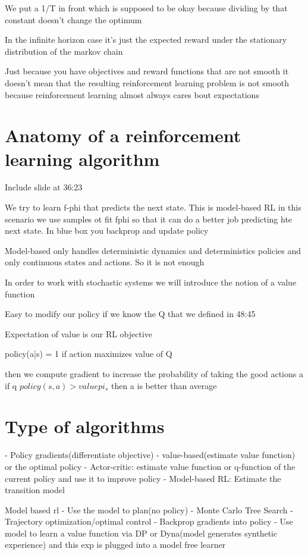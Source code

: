 \documentclass{article}
\begin{document}
We put a 1/T in front which is supposed to be okay because dividing by that constant doesn't change the optimum

In the infinite horizon case it's just the expected reward under the stationary distribution of the markov chain

Just because you have objectives and reward functions that are not smooth it doesn't mean that the resulting reinforcement learning problem is not smooth because reinforcement learning almost always cares bout expectations


\section{Anatomy of a reinforcement learning algorithm}

Include slide at 36:23

We try to learn f-phi that predicts the next state. This is model-based RL
in this scenario we use samples ot fit fphi so that it can do a better job predicting hte next state. In blue box you backprop and update policy

Model-based only handles deterministic dynamics and deterministics policies and only continuous states and actions. So it is not enough

In order to work with stochastic systems we will introduce the notion of a value function

Easy to modify our policy if we know the Q that we defined in 48:45

Expectation of value is our RL objective~

policy(a|s) = 1 if action maximizes value of Q

then we compute gradient to increase the probability of taking the good actions a
if q $ policy(s,a) > valuepi_s$ then a is better than average

\section{Type of algorithms}
- Policy gradients(differentiate objective)
- value-based(estimate value function) or the optimal policy
- Actor-critic: estimate  value function or q-function of the current policy and use it to improve policy
- Model-based RL: Estimate the transition model

Model based rl
- Use the model to plan(no policy)
- Monte Carlo Tree Search
- Trajectory optimization/optimal control
- Backprop gradients into policy
- Use model to learn a value function via DP or Dyna(model generates synthetic experience) and this exp is plugged into a model free learner
\end{document}

